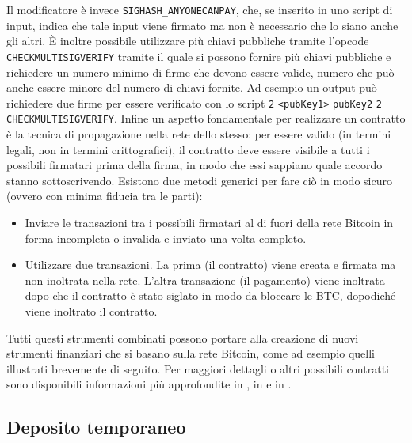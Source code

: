 Il modificatore è invece \verb|SIGHASH_ANYONECANPAY|, che, se inserito in uno script di input, indica che tale input viene firmato ma non è necessario che lo siano anche gli altri.
È inoltre possibile utilizzare più chiavi pubbliche tramite l'opcode \verb|CHECKMULTISIGVERIFY| tramite il quale si possono fornire più chiavi pubbliche e richiedere un numero minimo di firme che devono essere valide, numero che può anche essere minore del numero di chiavi fornite. Ad esempio un output può richiedere due firme per essere verificato con lo script \verb|2| \verb|<pubKey1>| \verb|pubKey2| \verb|2| \verb|CHECKMULTISIGVERIFY|.
Infine un aspetto fondamentale per realizzare un contratto è la tecnica di propagazione nella rete dello stesso: per essere valido (in termini legali, non in termini crittografici), il contratto deve essere visibile a tutti i possibili firmatari prima della firma, in modo che essi sappiano quale accordo stanno sottoscrivendo. Esistono due metodi generici per fare ciò in modo sicuro (ovvero con minima fiducia tra le parti):
\begin{itemize}
    \item Inviare le transazioni tra i possibili firmatari al di fuori della rete Bitcoin in forma incompleta o invalida e inviato una volta completo.
    \item Utilizzare due transazioni. La prima (il contratto) viene creata e firmata ma non inoltrata nella rete. L'altra transazione (il pagamento) viene inoltrata dopo che il contratto è stato siglato in modo da bloccare le BTC, dopodiché viene inoltrato il contratto.
\end{itemize}

Tutti questi strumenti combinati possono portare alla creazione di nuovi strumenti finanziari che si basano sulla rete Bitcoin, come ad esempio quelli illustrati brevemente di seguito. Per maggiori dettagli o altri possibili contratti sono disponibili informazioni più approfondite in \cite{bitcoin-contracts}, in \cite{nick-szabo} e in \cite{bitter-better}.

\subsection{Deposito temporaneo}

